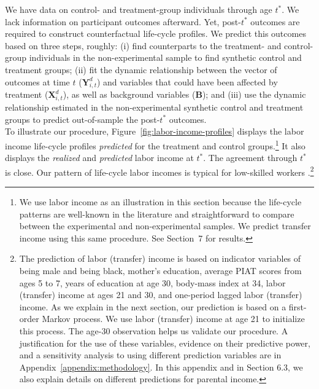\noindent We have data on control- and treatment-group individuals through age $t^{\ast}$. We lack information on participant outcomes afterward. Yet, post-$t^{\ast}$ outcomes are required to construct counterfactual life-cycle profiles. We predict this outcomes based on three steps, roughly: (i) find counterparts to the treatment- and control-group individuals in the non-experimental sample to find synthetic control and treatment groups; (ii) fit the dynamic relationship between the vector of outcomes at time $t$ ($\bm{Y}^{d}_{i,t}$) and variables that could have been affected by treatment ($\bm{X}^{d}_{i,t}$), as well as background variables ($\bm{B}$); and (iii) use the dynamic relationship estimated in the non-experimental synthetic control and treatment groups to predict out-of-sample the post-$t^{\ast}$ outcomes.\\ 

\noindent To illustrate our procedure, Figure~\ref{fig:labor-income-profiles} displays the labor income life-cycle profiles \textit{predicted} for the treatment and control groups.\footnote{We use labor income as an illustration in this section because the life-cycle patterns are well-known in the literature and straightforward to compare between the experimental and non-experimental samples. We predict transfer income using this same procedure. See Section~7 for results.} It also displays the \textit{realized} and \textit{predicted} labor income at $t^*$. The agreement through $t^*$ is close. Our pattern of life-cycle labor incomes is typical for low-skilled workers \citep{Blundell-etal_2015_J-Pub-E,Gladden_Taber_2000_WageProgression,Sanders-Taber_2012_AR,Lagakos_Moll_etal_2016_LifeCycle_NBER}.\footnote{The prediction of labor (transfer) income is based on indicator variables of being male and being black, mother's education, average PIAT scores from ages 5 to 7, years of education at age 30, body-mass index at 34, labor (transfer) income at ages 21 and 30, and one-period lagged labor (transfer) income. As we explain in the next section, our prediction is based on a first-order Markov process. We use labor (transfer) income at age 21 to initialize this process. The age-30 observation helps us validate our procedure. A justification for the use of these variables, evidence on their predictive power, and a sensitivity analysis to using different prediction variables are in Appendix~\ref{appendix:methodology}. In this appendix and in Section 6.3, we also explain details on different predictions for parental income.}\\

